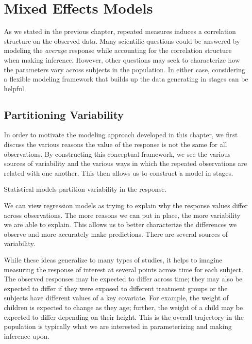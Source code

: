 \documentclass[
]{book}
\theoremstyle{plain}
\theoremstyle{mydefn}
\theoremstyle{myexmpl}
\theoremstyle{remark}
\begin{document}
\hypertarget{rm-mixed-models}{%
\chapter{Mixed Effects Models}\label{rm-mixed-models}}

As we stated in the previous chapter, repeated measures induces a correlation structure on the observed data. Many scientific questions could be answered by modeling the \emph{average} response while accounting for the correlation structure when making inference. However, other questions may seek to characterize how the parameters vary across subjects in the population. In either case, considering a flexible modeling framework that builds up the data generating in stages can be helpful.

\hypertarget{partitioning-variability}{%
\section{Partitioning Variability}\label{partitioning-variability}}

In order to motivate the modeling approach developed in this chapter, we first discuss the various reasons the value of the response is not the same for all observations. By constructing this conceptual framework, we see the various sources of variability and the various ways in which the repeated observations are related with one another. This then allows us to construct a model in stages.

\begin{rmdkeyidea}
Statistical models partition variability in the response.
\end{rmdkeyidea}

We can view regression models as trying to explain why the response values differ across observations. The more reasons we can put in place, the more variability we are able to explain. This allows us to better characterize the differences we observe and more accurately make predictions. There are several sources of variability.

While these ideas generalize to many types of studies, it helps to imagine measuring the response of interest at several points across time for each subject. The observed responses may be expected to differ across time; they may also be expected to differ if they were exposed to different treatment groups or the subjects have different values of a key covariate. For example, the weight of children is expected to change as they age; further, the weight of a child may be expected to differ depending on their height. This is the overall trajectory in the population is typically what we are interested in parameterizing and making inference upon.
\end{document}
